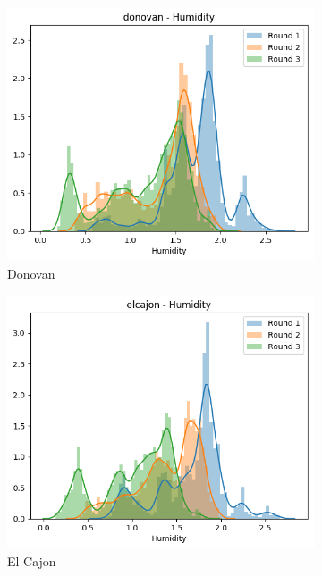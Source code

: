 \documentclass{article}
\begin{document}
\begin{figure}
\centering
\begin{subfigure}{0.32\textwidth}
\includegraphics[width=\textwidth]{results/distributions/location_donovan_humidity.png}
\caption{Donovan}
\end{subfigure}
\begin{subfigure}{0.32\textwidth}
\includegraphics[width=\textwidth]{results/distributions/location_elcajon_humidity.png}
\caption{El Cajon}
\end{subfigure}
\begin{subfigure}{0.32\textwidth}

\end{subfigure}
\end{figure}
\end{document}

